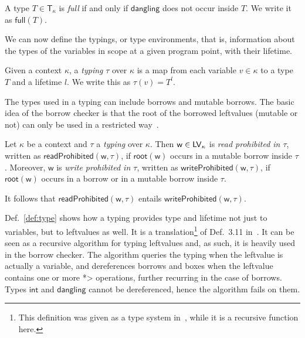 \begin{definition}\label{def:full}
  A type $T\in\mathsf{T}_\kappa$ is \emph{full}
  if and only if $\mathsf{dangling}$ does not occur inside $T$.
  We write it as $\mathsf{full}(T)$.
\end{definition}

We can now define the typings, or type environments, that is,
information about the types of the variables in scope at a given program point,
with their lifetime.

\begin{definition}[Typing]\label{def:typing}
  Given a context $\kappa$, a \emph{typing} $\tau$ over $\kappa$ is
  a map from each variable $v\in\kappa$ to a type $T$ and a lifetime $l$.
  We write this as $\tau(v)=T^l$.
\end{definition}

The types used in a typing can include borrows and mutable borrows.
The basic idea of the borrow checker is that the root of the
borrowed leftvalues (mutable or not) can only be used
in a restricted way~\cite{Pearce21}.

\begin{definition}\label{def:prohibited}
  Let $\kappa$ be a context and $\tau$ a \emph{typing} over $\kappa$.
  Then $\mathsf{w}\in\mathsf{LV}_\kappa$ is
  \emph{read prohibited in $\tau$},
  written as $\mathsf{readProhibited}(\mathsf{w},\tau)$,
  if $\mathsf{root}(\mathsf{w})$ occurs in a mutable borrow inside $\tau$.
  Moreover, $\mathsf{w}$ is \emph{write prohibited in $\tau$}, written
  as $\mathsf{writeProhibited}(\mathsf{w},\tau)$,
  if $\mathsf{root}(\mathsf{w})$ occurs in a borrow or in a
  mutable borrow inside $\tau$.
\end{definition}

\noindent
It follows that $\mathsf{readProhibited}(\mathsf{w},\tau)$ entails
$\mathsf{writeProhibited}(\mathsf{w},\tau)$.

Def.~\ref{def:type} shows how a typing provides type and lifetime not just to variables,
but to leftvalues as well.
It is a translation\footnote{This definition was given as a type system in~\cite{Pearce21}, while it is a recursive function here.} of
Def.~3.11 in~\cite{Pearce21}.
It can be seen as a recursive algorithm for typing leftvalues
and, as such, it is heavily used in the borrow checker.
The algorithm queries the typing when the leftvalue is actually a variable,
and dereferences borrows and boxes when the leftvalue contains one or more
\<*> operations, further recurring in the case of borrows.
Types $\mathsf{int}$ and $\mathsf{dangling}$ cannot be dereferenced, hence the
algorithm fails on them.

